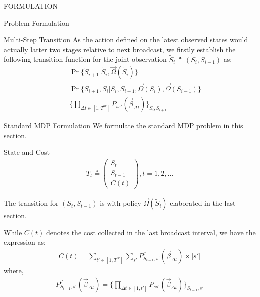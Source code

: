 \documentclass[10pt, conference, letterpaper]{IEEEtran}
\begin{document}
\begin{section}{FORMULATION}
\begin{subsection}{Problem Formulation}
\begin{subsubsection}{Multi-Step Transition}
                As the action defined on the latest observed states would actually latter two stages relative to next broadcast, we firstly establish the following transition function for the joint observation $\tilde{S}_i \triangleq (S_{i}, S_{i-1})$ as:
                \begin{align}
                    & \Pr\{\tilde{S}_{i+1} | \tilde{S}_{i}, \vec{\Omega}(\tilde{S}_i)\}
                    \nonumber\\
                    = & \Pr\{S_{i+1}, S_{i} | S_{i},S_{i-1}, \vec{\Omega}(S_{i}), \vec{\Omega}(S_{i-1})\}
                    \nonumber\\
                    = & \{
                            \prod_{\Delta{t} \in [1,T^{br}]} P_{ss'}(\vec{\beta}_{\Delta{t}})
                        \}_{S_{i}, S_{i+1}}
                \end{align}
            \end{subsubsection}

        \end{subsection}

        \begin{subsection}{Standard MDP Formulation}
            We formulate the standard MDP problem in this section.

            \begin{subsubsection}{State and Cost}
                \begin{align}
                    T_t \triangleq \begin{pmatrix}
                        S_t \\ S_{t-1} \\ C(t)
                    \end{pmatrix}, t=1,2,\dots
                \end{align}

                The transition for $(S_{t}, S_{t-1})$ is with policy $\vec{\Omega}(\tilde{S}_i)$ elaborated in the last section.
                
                While $C(t)$ denotes the cost collected in the last broadcast interval, we have the expression as:
                \begin{align}
                    C(t) = \sum_{t'\in[1,T^{br}]} \sum_{s'} P_{S_{t-1},s'}^{t'}(\vec{\beta}_{\Delta{t}}) \times |s'|
                \end{align}
                where,
                \begin{align}
                    P_{S_{t-1},s'}^{t'}(\vec{\beta}_{\Delta{t}})
                    = \{
                        \prod_{\Delta{t} \in [1,t']} P_{ss'}(\vec{\beta}_{\Delta{t}})
                    \}_{S_{t-1}, s'}
                \end{align}
            \end{subsubsection}


\end{subsection}
\end{section}
\end{document}
